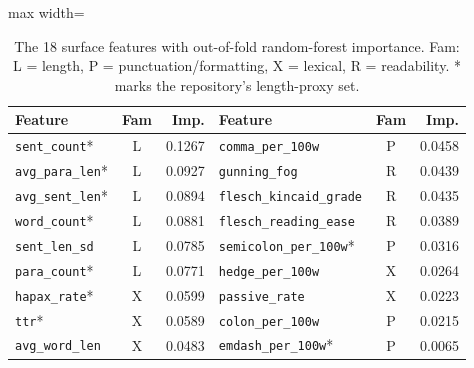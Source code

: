 \begin{table}[t]
\centering
\begin{adjustbox}{max width=\linewidth}
\begin{tabular}{lcrlcr}
\toprule
Feature & Fam & Imp. & Feature & Fam & Imp. \\
\midrule
\texttt{sent\_count}* & L & 0.1267 & \texttt{comma\_per\_100w} & P & 0.0458 \\
\texttt{avg\_para\_len}* & L & 0.0927 & \texttt{gunning\_fog} & R & 0.0439 \\
\texttt{avg\_sent\_len}* & L & 0.0894 & \texttt{flesch\_kincaid\_grade} & R & 0.0435 \\
\texttt{word\_count}* & L & 0.0881 & \texttt{flesch\_reading\_ease} & R & 0.0389 \\
\texttt{sent\_len\_sd} & L & 0.0785 & \texttt{semicolon\_per\_100w}* & P & 0.0316 \\
\texttt{para\_count}* & L & 0.0771 & \texttt{hedge\_per\_100w} & X & 0.0264 \\
\texttt{hapax\_rate}* & X & 0.0599 & \texttt{passive\_rate} & X & 0.0223 \\
\texttt{ttr}* & X & 0.0589 & \texttt{colon\_per\_100w} & P & 0.0215 \\
\texttt{avg\_word\_len} & X & 0.0483 & \texttt{emdash\_per\_100w}* & P & 0.0065 \\
\bottomrule
\end{tabular}
\end{adjustbox}
\caption{The 18 surface features with out-of-fold random-forest importance. Fam: L = length, P = punctuation/formatting, X = lexical, R = readability. * marks the repository's length-proxy set.}
\label{tab:features}
\end{table}
